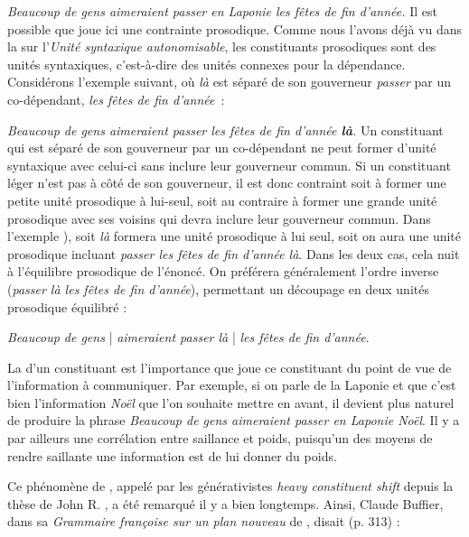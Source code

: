 \ea
    {\itshape Beaucoup de gens aimeraient passer en Laponie les fêtes de fin d’année.}
\z
Il est possible que joue ici une contrainte prosodique. Comme nous l’avons déjà vu dans la  sur l’\textit{Unité syntaxique autonomisable}, les constituants prosodiques sont des unités syntaxiques, c’est-à-dire des unités connexes pour la dépendance. Considérons l’exemple suivant, où \textit{là} est séparé de son gouverneur \textit{passer} par un co-dépendant, \textit{les fêtes de fin d’année~}:

\ea\label{ex:fetes}
{\itshape Beaucoup de gens aimeraient passer les fêtes de fin d’année \textbf{{là}}.}
\z
Un constituant qui est séparé de son gouverneur par un co-dépendant ne peut former d’unité syntaxique avec celui-ci sans inclure leur gouverneur commun. Si un constituant léger n’est pas à côté de son gouverneur, il est donc contraint soit à former une petite unité prosodique à lui-seul, soit au contraire à former une grande unité prosodique avec ses voisins qui devra inclure leur gouverneur commun. Dans l'exemple ), soit \textit{là} formera une unité prosodique à lui seul, soit on aura une unité prosodique incluant \textit{passer les fêtes de fin d'année là}. Dans les deux cas, cela nuit à l’équilibre prosodique de l’énoncé. On préférera généralement l’ordre inverse (\textit{passer là les fêtes de fin d’année}), permettant un découpage en deux unités prosodique équilibré :

\ea
\textit{Beaucoup de gens} | \textit{aimeraient passer là} | \textit{les fêtes de fin d’année}.
\z

La  d’un constituant est l’importance que joue ce constituant du point de vue de l’information à communiquer. Par exemple, si on parle de la Laponie et que c’est bien l’information \textit{Noël} que l’on souhaite mettre en avant, il devient plus naturel de produire la phrase \textit{Beaucoup de gens aimeraient passer en Laponie Noël}. Il y a par ailleurs une corrélation entre saillance et poids, puisqu’un des moyens de rendre saillante une information est de lui donner du poids.

Ce phénomène de , appelé par les générativistes \textit{heavy constituent shift} depuis la thèse de John R. \citet{ross1967constraints}, a été remarqué il y a bien longtemps. Ainsi, Claude Buffier, dans sa \textit{Grammaire françoise sur un plan nouveau} de \citeyear{buffier1709grammaire}, disait (p. 313) :

